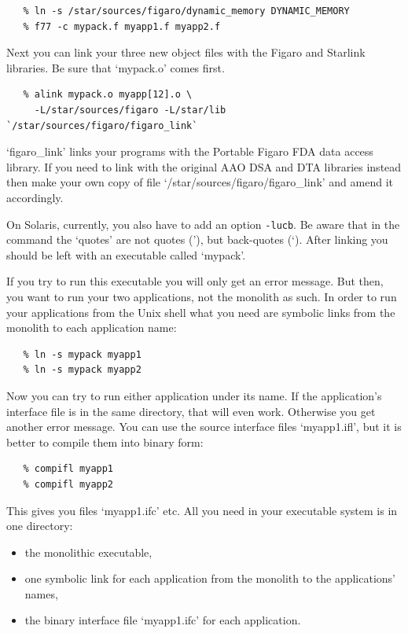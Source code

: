 \documentclass[11pt,twoside]{article}
\begin{document}
\begin{verbatim}
   % ln -s /star/sources/figaro/dynamic_memory DYNAMIC_MEMORY
   % f77 -c mypack.f myapp1.f myapp2.f
\end{verbatim}

   Next you can link your three new object files with the Figaro and
   Starlink libraries. Be sure that `mypack.o' comes first.

\begin{verbatim}
   % alink mypack.o myapp[12].o \
     -L/star/sources/figaro -L/star/lib `/star/sources/figaro/figaro_link`
\end{verbatim}

   `figaro\_link' links your programs with the Portable Figaro FDA data
   access library.  If you need to link with the original AAO DSA and
   DTA libraries instead then make your own copy of file
   `/star/sources/figaro/figaro\_link' and amend it accordingly.

   On Solaris, currently, you also have to add an option {\tt -lucb}.
   Be aware that in the command the `quotes' are not quotes ('), but
   back-quotes (`). After linking you should be left with an executable
   called `mypack'.

   If you try to run this executable you will only get an error message.
   But then, you want to run your two applications, not the monolith as
   such. In order to run your applications from the Unix shell what
   you need are symbolic links from the monolith to each application name:

\begin{verbatim}
   % ln -s mypack myapp1
   % ln -s mypack myapp2
\end{verbatim}

   Now you can try to run either application under its name. If the
   application's interface file is in the same directory, that will even
   work. Otherwise you get another error message. You can use the
   source interface files `myapp1.ifl', but it is better to compile them
   into binary form:

\begin{verbatim}
   % compifl myapp1
   % compifl myapp2
\end{verbatim}

   This gives you files `myapp1.ifc' etc. All you need in your
   executable system is in one directory:

\begin{itemize}
\item
   the monolithic executable,
\item
   one symbolic link for each application from the monolith to the
   applications' names,
\item
   the binary interface file `myapp1.ifc' for each application.
\end{itemize}
\end{document}
